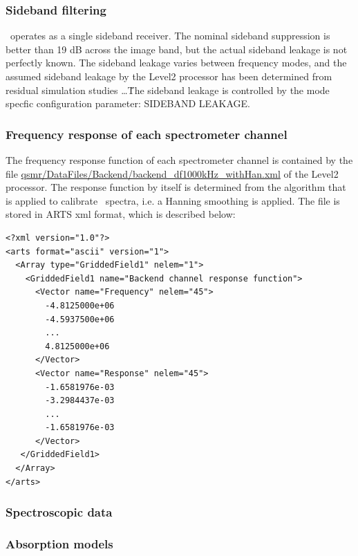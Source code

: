 \subsubsection*{Sideband filtering}


\smr\ operates as a single sideband receiver. 
The nominal sideband suppression is better than 19 dB across the image band,
but the actual sideband leakage is not perfectly known.
The sideband leakage varies between frequency modes, and the
assumed sideband leakage by the Level2 processor has been determined
from residual simulation studies \dots{}\.
The sideband leakage is controlled by the mode specfic configuration 
parameter: SIDEBAND LEAKAGE.  


\subsubsection*{Frequency response of each spectrometer channel}

The frequency response function of each spectrometer channel
is contained by the file
\url{qsmr/DataFiles/Backend/backend\_df1000kHz\_withHan.xml}
of the Level2 processor.
The response function by itself is determined from
the algorithm that is applied to calibrate \smr\ spectra,
i.e. a Hanning smoothing is applied.
The file is stored in ARTS xml format, which is
described below:

\lstset{language=XML}
\begin{lstlisting}
<?xml version="1.0"?>
<arts format="ascii" version="1">
  <Array type="GriddedField1" nelem="1">
    <GriddedField1 name="Backend channel response function">
      <Vector name="Frequency" nelem="45">
        -4.8125000e+06
        -4.5937500e+06
        ...
        4.8125000e+06
      </Vector>
      <Vector name="Response" nelem="45">
        -1.6581976e-03
        -3.2984437e-03
        ...
        -1.6581976e-03
      </Vector>
   </GriddedField1>
  </Array>
</arts>
\end{lstlisting}


\subsubsection{Spectroscopic data}


\subsubsection*{Absorption models}



